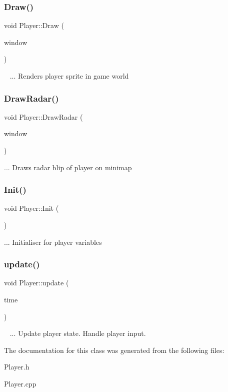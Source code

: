 \subsubsection{\texorpdfstring{Draw()}{Draw()}}
{\footnotesize\ttfamily void Player\+::\+Draw (\begin{DoxyParamCaption}\item[{sf\+::\+Render\+Window \&}]{window }\end{DoxyParamCaption})}

~\newline
... Renders player sprite in game world\mbox{\label{class_player_ac91387d54e20b6e9286c2e2ecba5afc7}} 
\subsubsection{\texorpdfstring{Draw\+Radar()}{DrawRadar()}}
{\footnotesize\ttfamily void Player\+::\+Draw\+Radar (\begin{DoxyParamCaption}\item[{sf\+::\+Render\+Window \&}]{window }\end{DoxyParamCaption})}

... Draws radar blip of player on minimap\mbox{\label{class_player_a4523bf2e637fcb0e36a3f456ec397e7d}} 
\subsubsection{\texorpdfstring{Init()}{Init()}}
{\footnotesize\ttfamily void Player\+::\+Init (\begin{DoxyParamCaption}{ }\end{DoxyParamCaption})}

... Initialiser for player variables\mbox{\label{class_player_a194b7082791d882887071d8d2893c5e4}} 
\subsubsection{\texorpdfstring{update()}{update()}}
{\footnotesize\ttfamily void Player\+::update (\begin{DoxyParamCaption}\item[{float}]{time }\end{DoxyParamCaption})}

~\newline
... Update player state. Handle player input.

The documentation for this class was generated from the following files\+:\begin{DoxyCompactItemize}
\item 
Player.\+h\item 
Player.\+cpp\end{DoxyCompactItemize}

